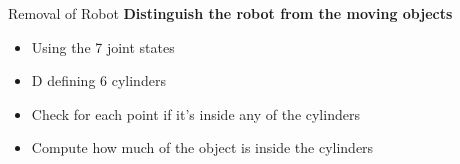 \begin{frame}{Removal of Robot}
\textbf{Distinguish the robot from the moving objects}
	\begin{itemize}
	\item Using the 7 joint states
	\item D defining 6 cylinders
	\item Check for each point if it's inside any of the cylinders
	\item Compute how much of the object is inside the cylinders
	\end{itemize}
		
\end{frame}